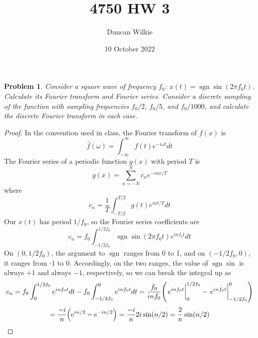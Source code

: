 \documentclass{article}
\title{4750 HW 3}
\author{Duncan Wilkie}
\date{10 October 2022}
\newtheorem{plm}{Problem}
\DeclareMathOperator{\sgn}{sgn}
\begin{document}
\maketitle

\begin{plm}
  Consider a square wave of frequency $f_{0}$: $x(t) = \sgn\sin(2\pi f_{0}t)$.
  Calculate its Fourier transform and Fourier series.
  Consider a discrete sampling of the function with sampling frequencies $f_{0}/2$, $f_{0}/5$, and $f_{0}/1000$,
  and calculate the discrete Fourier transform in each case.
\end{plm}

\begin{proof}
  In the convention used in class, the Fourier transform of $f(x)$ is
  \[
    \hat{f}(\omega) = \int_{-\infty}^{\infty}f(t)e^{-i\omega t}dt
  \]
  The Fourier series of a periodic function $g(x)$ with period $T$ is
  \[
    g(x) = \sum_{n = -N}^{N}c_{n}e^{-inx / T}
  \]
  where
  \[
    c_{n} = \frac{1}{T}\int_{-T/2}^{T/2}g(t)e^{int/T}dt
  \]
  Our $x(t)$ has period $1 / f_{0}$, so the Fourier series coefficients are
  \[
    c_{n} = f_{0}\int_{-1/2f_{0}}^{1/2f_{0}}\sgn\sin(2\pi f_{0}t)e^{inf_{0}t}dt
  \]
  On $(0, 1/2f_{0})$, the argument to $\sgn$ ranges from 0 to 1, and on $(-1/2f_{0}, 0)$, it ranges from -1 to 0.
  Accordingly, on the two ranges, the value of $\sgn\sin$ is always $+1$ and always $-1$, respectively, so we can break the integral up as
  \[
    c_{n} = f_{0}\int_{0}^{1/2f_{0}}e^{inf_{0}t}dt - f_{0}\int_{-1/2 f_{0}}^{0}e^{in f_{0}t}dt
    = \frac{f_{0}}{inf_{0}}\qty(\eval{e^{inf_{0}t}}_{0}^{1/2f_{0}} - \eval{e^{inf_{0}t}}_{-1/2f_{0}}^{0})
  \]
  \[
    = \frac{-i}{n}\qty(e^{in/2} - e^{-in/2})
    = \frac{-i}{n}2i\sin(n / 2)
    = \frac{2}{n}\sin(n/2)
  \]


\end{proof}
\end{document}
